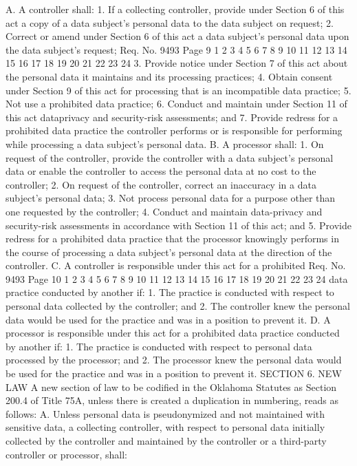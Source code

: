 A. A controller shall:
1. If a collecting controller, provide under Section 6 of this
act a copy of a data subject's personal data to the data subject on
request;
2. Correct or amend under Section 6 of this act a data
subject's personal data upon the data subject's request;
Req. No. 9493 Page 9
1
2
3
4
5
6
7
8
9
10
11
12
13
14
15
16
17
18
19
20
21
22
23
24
3. Provide notice under Section 7 of this act about the
personal data it maintains and its processing practices;
4. Obtain consent under Section 9 of this act for processing
that is an incompatible data practice;
5. Not use a prohibited data practice;
6. Conduct and maintain under Section 11 of this act dataprivacy and security-risk assessments; and
7. Provide redress for a prohibited data practice the
controller performs or is responsible for performing while
processing a data subject's personal data.
B. A processor shall:
1. On request of the controller, provide the controller with a
data subject's personal data or enable the controller to access the
personal data at no cost to the controller;
2. On request of the controller, correct an inaccuracy in a
data subject's personal data;
3. Not process personal data for a purpose other than one
requested by the controller;
4. Conduct and maintain data-privacy and security-risk
assessments in accordance with Section 11 of this act; and
5. Provide redress for a prohibited data practice that the
processor knowingly performs in the course of processing a data
subject's personal data at the direction of the controller.
C. A controller is responsible under this act for a prohibited 
Req. No. 9493 Page 10
1
2
3
4
5
6
7
8
9
10
11
12
13
14
15
16
17
18
19
20
21
22
23
24
data practice conducted by another if:
1. The practice is conducted with respect to personal data
collected by the controller; and
2. The controller knew the personal data would be used for the
practice and was in a position to prevent it.
D. A processor is responsible under this act for a prohibited data
practice conducted by another if:
1. The practice is conducted with respect to personal data
processed by the processor; and
2. The processor knew the personal data would be used for the
practice and was in a position to prevent it.
SECTION 6. NEW LAW A new section of law to be codified
in the Oklahoma Statutes as Section 200.4 of Title 75A, unless there
is created a duplication in numbering, reads as follows:
A. Unless personal data is pseudonymized and not maintained
with sensitive data, a collecting controller, with respect to
personal data initially collected by the controller and maintained
by the controller or a third-party controller or processor, shall:
